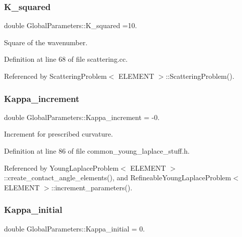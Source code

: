\subsubsection{\texorpdfstring{K\+\_\+squared}{K\_squared}}
{\footnotesize\ttfamily double Global\+Parameters\+::\+K\+\_\+squared =10.}



Square of the wavenumber. 



Definition at line 68 of file scattering.\+cc.



Referenced by Scattering\+Problem$<$ E\+L\+E\+M\+E\+N\+T $>$\+::\+Scattering\+Problem().

\mbox{\label{namespaceGlobalParameters_a74cc88d6dc206cd556fb12e7e3101032}} 
\subsubsection{\texorpdfstring{Kappa\+\_\+increment}{Kappa\_increment}}
{\footnotesize\ttfamily double Global\+Parameters\+::\+Kappa\+\_\+increment = -\/0.}



Increment for prescribed curvature. 



Definition at line 86 of file common\+\_\+young\+\_\+laplace\+\_\+stuff.\+h.



Referenced by Young\+Laplace\+Problem$<$ E\+L\+E\+M\+E\+N\+T $>$\+::create\+\_\+contact\+\_\+angle\+\_\+elements(), and Refineable\+Young\+Laplace\+Problem$<$ E\+L\+E\+M\+E\+N\+T $>$\+::increment\+\_\+parameters().

\mbox{\label{namespaceGlobalParameters_ae7651e73d3f8346da9fcfdbb149bc22e}} 
\subsubsection{\texorpdfstring{Kappa\+\_\+initial}{Kappa\_initial}}
{\footnotesize\ttfamily double Global\+Parameters\+::\+Kappa\+\_\+initial = 0.}



